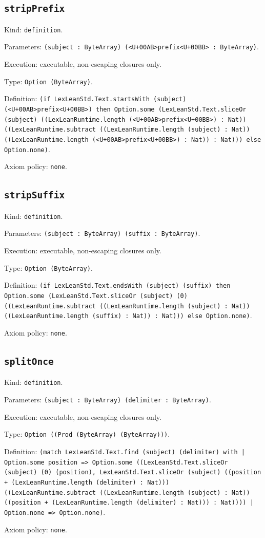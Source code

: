 \documentclass[11pt]{article}
\begin{document}
\subsection*{\texttt{stripPrefix}}
\noindent Kind: \texttt{definition}.\par
\noindent Parameters: \texttt{(subject : ByteArray) (<U+00AB>prefix<U+00BB> : ByteArray)}.\par
\noindent Execution: executable, non-escaping closures only.\par
\noindent Type: \texttt{Option (ByteArray)}.\par
\noindent Definition: \texttt{(if LexLeanStd.Text.startsWith (subject) (<U+00AB>prefix<U+00BB>) then Option.some (LexLeanStd.Text.sliceOr (subject) ((LexLeanRuntime.length (<U+00AB>prefix<U+00BB>) : Nat)) ((LexLeanRuntime.subtract ((LexLeanRuntime.length (subject) : Nat)) ((LexLeanRuntime.length (<U+00AB>prefix<U+00BB>) : Nat)) : Nat))) else Option.none)}.\par
\noindent Axiom policy: \texttt{none}.\par
\subsection*{\texttt{stripSuffix}}
\noindent Kind: \texttt{definition}.\par
\noindent Parameters: \texttt{(subject : ByteArray) (suffix : ByteArray)}.\par
\noindent Execution: executable, non-escaping closures only.\par
\noindent Type: \texttt{Option (ByteArray)}.\par
\noindent Definition: \texttt{(if LexLeanStd.Text.endsWith (subject) (suffix) then Option.some (LexLeanStd.Text.sliceOr (subject) (0) ((LexLeanRuntime.subtract ((LexLeanRuntime.length (subject) : Nat)) ((LexLeanRuntime.length (suffix) : Nat)) : Nat))) else Option.none)}.\par
\noindent Axiom policy: \texttt{none}.\par
\subsection*{\texttt{splitOnce}}
\noindent Kind: \texttt{definition}.\par
\noindent Parameters: \texttt{(subject : ByteArray) (delimiter : ByteArray)}.\par
\noindent Execution: executable, non-escaping closures only.\par
\noindent Type: \texttt{Option ((Prod (ByteArray) (ByteArray)))}.\par
\noindent Definition: \texttt{(match LexLeanStd.Text.find (subject) (delimiter) with | Option.some position => Option.some ((LexLeanStd.Text.sliceOr (subject) (0) (position), LexLeanStd.Text.sliceOr (subject) ((position + (LexLeanRuntime.length (delimiter) : Nat))) ((LexLeanRuntime.subtract ((LexLeanRuntime.length (subject) : Nat)) ((position + (LexLeanRuntime.length (delimiter) : Nat))) : Nat)))) | Option.none => Option.none)}.\par
\noindent Axiom policy: \texttt{none}.\par
\end{document}
